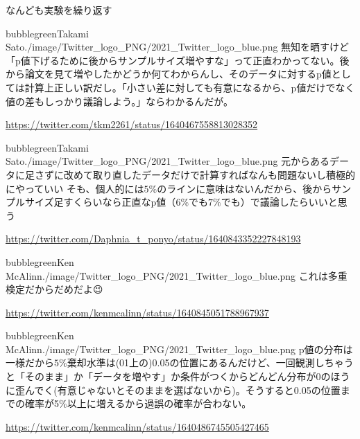 \begin{SMbox}{なんども実験を繰り返す}
\begin{rightbubbles}{bubblegreen}{Takami Sato}{./image/Twitter_logo_PNG/2021_Twitter_logo_blue.png}
    無知を晒すけど「p値下げるために後からサンプルサイズ増やすな」って正直わかってない。後から論文を見て増やしたかどうか何てわからんし、そのデータに対するp値としては計算上正しい訳だし。「小さい差に対しても有意になるから、p値だけでなく値の差もしっかり議論しよう。」ならわかるんだが。
    \begin{flushright} 
        \small	\url{https://twitter.com/tkm2261/status/1640467558813028352}
        \end{flushright}  
\end{rightbubbles}

\begin{rightbubbles}{bubblegreen}{Takami Sato}{./image/Twitter_logo_PNG/2021_Twitter_logo_blue.png}
    元からあるデータに足さずに改めて取り直したデータだけで計算すればなんも問題ないし積極的にやっていい
    そも、個人的には$5\%$のラインに意味はないんだから、後からサンプルサイズ足すくらいなら正直なp値（$6\%$でも$7\%$でも）で議論したらいいと思う
    \begin{flushright} 
        \small	\url{https://twitter.com/Daphnia_t_ponyo/status/1640843352227848193}
        \end{flushright}  
\end{rightbubbles}

\begin{rightbubbles}{bubblegreen}{Ken McAlinn}{./image/Twitter_logo_PNG/2021_Twitter_logo_blue.png}
    これは多重検定だからだめだよ😉
\begin{flushright} 
\small	\url{https://twitter.com/kenmcalinn/status/1640845051788967937}
\end{flushright}    
\end{rightbubbles}


\begin{rightbubbles}{bubblegreen}{Ken McAlinn}{./image/Twitter_logo_PNG/2021_Twitter_logo_blue.png}
  p値の分布は一様だから$5\%$棄却水準は(01上の)0.05の位置にあるんだけど、一回観測しちゃうと「そのまま」か「データを増やす」か条件がつくからどんどん分布が0のほうに歪んでく(有意じゃないとそのままを選ばないから)。そうすると0.05の位置までの確率が5$\%$以上に増えるから過誤の確率が合わない。
\begin{flushright} 
\small	\url{https://twitter.com/kenmcalinn/status/1640486745505427465}
\end{flushright}    
\end{rightbubbles}



\end{SMbox}
